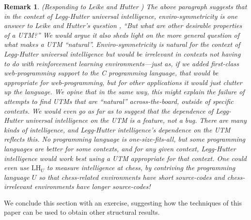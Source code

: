 \documentclass{article}
\newtheorem{remark}[theorem]{Remark}
\def\LH{\textrm{LH}}
\begin{document}
\begin{remark}
\label{leikeresponse}
(Responding to Leike and Hutter \cite{leike2015bad})
The above paragraph suggests that in the context of Legg-Hutter universal intelligence,
enviro-symmetricity is one answer to Leike and Hutter's question \cite{leike2015bad},
``But what are other desirable properties of a UTM?'' We would argue it also sheds light
on the more general question of what makes a UTM ``natural''. Enviro-symmetricity is
natural for the context of Legg-Hutter universal intelligence but would be
irrelevant in contexts not having to do with reinforcement learning environments---just
as, if we added first-class web-programming support to the C programming language,
that would be appropriate for web-programming, but for other applications it would just
clutter up the language. We opine that in the same way, this might explain the failure of
attempts \cite{muller2010stationary} to find UTMs that are ``natural'' across-the-board,
outside of specific contexts. We would even go as far as to suggest that the dependence
of Legg-Hutter universal intelligence on the UTM is a feature, not a bug. There are many
kinds of intelligence, and Legg-Hutter intelligence's dependence on the UTM
reflects this. No programming language is one-size-fits-all, but some programming
languages are better for some contexts, and for any given context, Legg-Hutter intelligence
would work best using a UTM appropriate for that context. One could even use $\LH_U$ to
measure intelligence at chess, by contriving the programming language $U$ so that chess-related
environments have short source-codes and chess-irrelevant environments have longer
source-codes!
\end{remark}

We conclude this section with an exercise, suggesting how the techniques of this paper
can be used to obtain other structural results.
\end{document}
